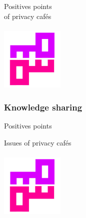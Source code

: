 \documentclass{beamer}
\begin{document}
\begin{frame}
\begin{center}
\Huge{Positives points\\ of privacy cafés}
\\~\\
\includegraphics[width=3cm,height=3cm]{./CryptopartyGenericLogo.jpg} 
\end{center}
\end{frame}


\begin{frame}
\frametitle{Knowledge sharing}

\begin{block}{Positives points}
\begin{itemize}
\end{itemize}
\end{block}
\end{frame}
  
\begin{frame}
\begin{center}
\Huge{Issues of privacy cafés}
\\~\\
\includegraphics[width=3cm,height=3cm]{./CryptopartyGenericLogo.jpg} 
\end{center}
\end{frame}
\end{document}
